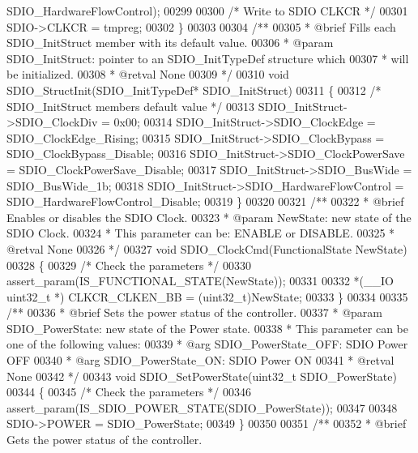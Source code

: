 \begin{DoxyCode}
      SDIO_HardwareFlowControl);
00299 
00300   \textcolor{comment}{/* Write to SDIO CLKCR */}
00301   SDIO->CLKCR = tmpreg;
00302 \}
00303 
00304 \textcolor{comment}{/**}
00305 \textcolor{comment}{  * @brief  Fills each SDIO\_InitStruct member with its default value.}
00306 \textcolor{comment}{  * @param  SDIO\_InitStruct: pointer to an SDIO\_InitTypeDef structure which }
00307 \textcolor{comment}{  *         will be initialized.}
00308 \textcolor{comment}{  * @retval None}
00309 \textcolor{comment}{  */}
00310 \textcolor{keywordtype}{void} SDIO_StructInit(SDIO\_InitTypeDef* SDIO\_InitStruct)
00311 \{
00312   \textcolor{comment}{/* SDIO\_InitStruct members default value */}
00313   SDIO\_InitStruct->SDIO_ClockDiv = 0x00;
00314   SDIO\_InitStruct->SDIO_ClockEdge = SDIO_ClockEdge_Rising;
00315   SDIO\_InitStruct->SDIO_ClockBypass = SDIO_ClockBypass_Disable;
00316   SDIO\_InitStruct->SDIO_ClockPowerSave = SDIO_ClockPowerSave_Disable;
00317   SDIO\_InitStruct->SDIO_BusWide = SDIO_BusWide_1b;
00318   SDIO\_InitStruct->SDIO_HardwareFlowControl = 
      SDIO_HardwareFlowControl_Disable;
00319 \}
00320 
00321 \textcolor{comment}{/**}
00322 \textcolor{comment}{  * @brief  Enables or disables the SDIO Clock.}
00323 \textcolor{comment}{  * @param  NewState: new state of the SDIO Clock. }
00324 \textcolor{comment}{  *         This parameter can be: ENABLE or DISABLE.}
00325 \textcolor{comment}{  * @retval None}
00326 \textcolor{comment}{  */}
00327 \textcolor{keywordtype}{void} SDIO_ClockCmd(FunctionalState NewState)
00328 \{
00329   \textcolor{comment}{/* Check the parameters */}
00330   assert_param(IS\_FUNCTIONAL\_STATE(NewState));
00331 
00332   *(\_\_IO uint32\_t *) CLKCR_CLKEN_BB = (uint32\_t)NewState;
00333 \}
00334 
00335 \textcolor{comment}{/**}
00336 \textcolor{comment}{  * @brief  Sets the power status of the controller.}
00337 \textcolor{comment}{  * @param  SDIO\_PowerState: new state of the Power state. }
00338 \textcolor{comment}{  *          This parameter can be one of the following values:}
00339 \textcolor{comment}{  *            @arg SDIO\_PowerState\_OFF: SDIO Power OFF}
00340 \textcolor{comment}{  *            @arg SDIO\_PowerState\_ON: SDIO Power ON}
00341 \textcolor{comment}{  * @retval None}
00342 \textcolor{comment}{  */}
00343 \textcolor{keywordtype}{void} SDIO_SetPowerState(uint32\_t SDIO\_PowerState)
00344 \{
00345   \textcolor{comment}{/* Check the parameters */}
00346   assert_param(IS\_SDIO\_POWER\_STATE(SDIO\_PowerState));
00347 
00348   SDIO->POWER = SDIO\_PowerState;
00349 \}
00350 
00351 \textcolor{comment}{/**}
00352 \textcolor{comment}{  * @brief  Gets the power status of the controller.}

\end{DoxyCode}
